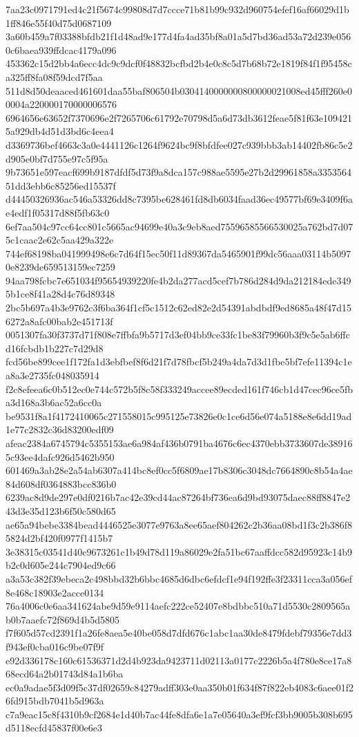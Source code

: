 {7aa23c0971791ed4c21f5674c99808d7d7ccce71b81b99c932d960754efef16af66029d1b1ff846e55f40d75d0687109
3a60b459a7f03388bfdb21f1d48ad9e177d4fa4ad35bf8a01a5d7bd36ad53a72d239e0560c6baea939ffdcac4179a096
453362c15d2bb4a6ecc4dc9c9dcf0f48832bcfbd2b4e0c8c5d7b68b72e1819f84f1f95458ca325ff8fa08f59dcd7f5aa
511d8d50deaaced461601daa55baf806504b0304140000000800000021008ed45fff260e00004a220000170000006576
6964656e63652f7370696e2f7265706c61792e70798d5a6d73db3612feae5f81f63e1094215a929db4d51d3bd6c4eea4
d3369736bef4663c3a0e4441126c1264f9624bc9f8bfdfee027c939bbb3ab14402fb86c5e2d905e0bf7d755e97c5f95a
9b73651e597eacf699b9187dfdf5d73f9a8dca157c988ae5595e27b2d29961858a335356451dd3ebb6c85256ed15537f
d44450326936ac546a53326dd8c7395be628461fd8db6034faad36ec49577bf69e3409f6ae4edf1f05317d88f5fb63c0
6ef7aa504c97cc64cc801c5665ac94699e40a3c9eb8aed75596585566530025a762bd7d075c1caac2e62c5aa429a322e
744ef68198ba041999498e6c7d64f15ec50f11d89367da5465901f99dc56aaa03114b50970e8239de659513159ec7259
94aa798fcbc7e651034f95654939220fe4b2da277acd5cef7b786d284d9da212184ede3495b1ce8f41a28d4c76d89348
2bc5b697a4b3e9762c3f6ba364f1cf5c1512c62ed82e2d54391abdbdf9ed8685a48f47d156272a8afc00bab2e451713f
0051307fa30f3737d71f808e7ffbfa9b5717d3ef04bb9ce33fc1be83f79960b3f9c5e5ab6ffcd16fcbdb1b227c7d29d8
fcd56be899cee1f172fa1d3ebfbef8f6d21f7d78fbcf5b249a4da7d3d1fbe5bf7efe11394c1ea8a3e2735fc048035914
f2c8efeea6c0b512ec0e744c572b5f8c58f333249accee89ecded161f746cb1d47cec96ce5fba3d168a3b6ac52a6cc0a
be9531f8a1f4172410065c271558015c995125e73826e0c1ce6d56e074a5188e8e6dd19ad1e77c2832c36d83200edf09
afeac2384a6745794c5355153ae6a984af436b0791ba4676c6ec4370ebb3733607de389165c93ee4dafc926d5462b950
601469a3ab28e2a54ab6307a414bc8ef0cc5f6809ae17b8306c3048dc7664890c8b54a4ae84d608df0364883bcc836b0
6239ac8d9de297e0df0216b7ac42e39cd44ac87264bf736ea6d9bd93075daec88ff8847e243d3e35d123b6f50c580d65
ae65a94bebe3384bead4446525e3077e9763a8ee65aef804262c2b36aa08bd1f3c2b386f85824d2bf420f0977f1415b7
3e38315c03541d40c9673261c1b49d78d119a86029e2fa51bc67aaffdcc582d95923c14b9b2c0d605e244c7904ed9c66
a3a53c382f39ebeca2c498bbd32b6bbc4685d6dbc6efdcf1e94f192ffe3f23311cca3a056ef8e468c18903e2acce0134
76a4006c0e6aa341624abe9d59e9114aefc222ce52407e8bdbbc510a71d5530c2809565ab0b7aaefc72f869d4b5d5805
f7f605d57cd2391f1a26fe8aea5e40be058d7dfd676c1abc1aa30de8479fdebf79356e7dd3f943ef0cba016c9be07f9f
e92d336178c160c61536371d2d4b923da9423711d02113a0177c2226b5a4f780e8ce17a868ecd64a2b01743d84a1b6ba
ec0a9adae5f3d09f5c37df02659c84279adff303e0aa350b01f634f87f822eb4083c6aee01f26fd915bdb7041b5d963a
c7a9eac15c8f4310b9cf2684e1d40b7ac44fe8dfa6e1a7e05640a3ef9fcf3bb9005b308b695d5118ecfd45837f00e6e3
}

